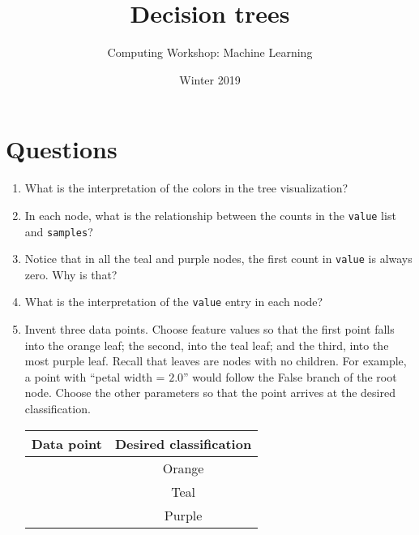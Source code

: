 \documentclass[11pt]{article}
\author{Computing Workshop: Machine Learning}
\title{Decision trees}
\date{Winter 2019}
\begin{document}
\maketitle

\section*{Questions}

\begin{enumerate}
\item
  What is the interpretation of the colors in the tree visualization?
  \vspace{2em}

\item
  In each node, what is the relationship between the counts in the
  \texttt{value} list and \texttt{samples}?
  \vspace{2em}

\item
  Notice that in all the teal and purple nodes, the first count in
  \texttt{value} is always zero. Why is that?
  \vspace{2em}

\item
  What is the interpretation of the \texttt{value} entry in each node?
  \vspace{2em}

\item
  Invent three data points.
  Choose feature values so that the first point falls into the orange leaf; the
  second, into the teal leaf; and the third, into the most purple leaf. Recall
  that leaves are nodes with no children.
  For example, a point with ``petal width = $2.0$'' would follow the False
  branch of the root node. Choose the other parameters so that the point arrives
  at the desired classification.

  \begin{center}
    \renewcommand{\arraystretch}{1.5}
    \begin{tabular}{|p{14em}|c|}
      \hline %
      \textbf{Data point} & \textbf{Desired classification} \\ \hline
      ~ & Orange \\ \hline
      ~ & Teal \\ \hline
      ~ & Purple \\ \hline
    \end{tabular}
  \end{center}
\end{enumerate}
\end{document}
